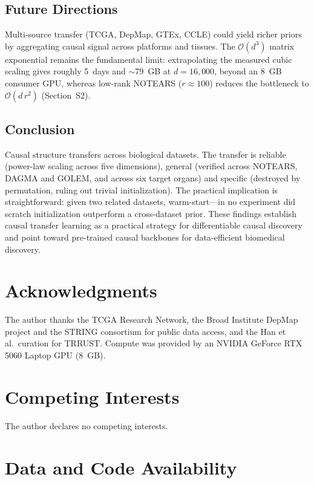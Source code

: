 \documentclass{ws-jbcb}
\begin{document}
\subsection{Future Directions}

Multi-source transfer (TCGA, DepMap, GTEx, CCLE) could yield richer priors by aggregating causal signal across platforms and tissues. The $\mathcal{O}(d^3)$ matrix exponential remains the fundamental limit: extrapolating the measured cubic scaling gives roughly 5~days and $\sim$79~GB at $d=16{,}000$, beyond an 8~GB consumer GPU, whereas low-rank NOTEARS ($r \approx 100$) reduces the bottleneck to $\mathcal{O}(d\,r^2)$ (Section~S2).

\subsection{Conclusion}

Causal structure transfers across biological datasets. The transfer is reliable (power-law scaling across five dimensions), general (verified across NOTEARS, DAGMA and GOLEM, and across six target organs) and specific (destroyed by permutation, ruling out trivial initialization). The practical implication is straightforward: given two related datasets, warm-start---in no experiment did scratch initialization outperform a cross-dataset prior. These findings establish causal transfer learning as a practical strategy for differentiable causal discovery and point toward pre-trained causal backbones for data-efficient biomedical discovery.

\section*{Acknowledgments}

The author thanks the TCGA Research Network, the Broad Institute DepMap project and the STRING consortium for public data access, and the Han et al.\ curation for TRRUST.\cite{han2018trrust} Compute was provided by an NVIDIA GeForce RTX 5060 Laptop GPU (8~GB).

\section*{Competing Interests}

The author declares no competing interests.

\section*{Data and Code Availability}
\end{document}
